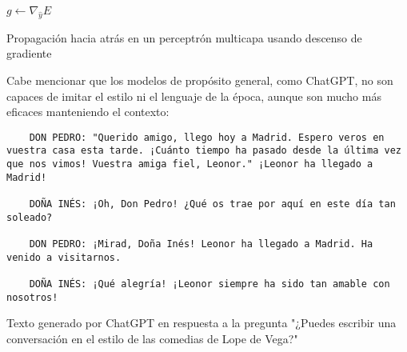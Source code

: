 \begin{algorithm}[tb]
    \SetAlgoLined
    $g \gets \nabla_{\widehat{y}} E$\;
    \caption{Propagación hacia atrás en un perceptrón multicapa usando descenso de gradiente}
    \label{algo:backward}
\end{algorithm}


Cabe mencionar que los modelos de propósito general, como ChatGPT, no son capaces de imitar el estilo ni el lenguaje de la época, aunque son mucho más eficaces manteniendo el contexto:

\begin{code}
    \centering
    \begin{verbatim}
    DON PEDRO: "Querido amigo, llego hoy a Madrid. Espero veros en vuestra casa esta tarde. ¡Cuánto tiempo ha pasado desde la última vez que nos vimos! Vuestra amiga fiel, Leonor." ¡Leonor ha llegado a Madrid!
    
    DOÑA INÉS: ¡Oh, Don Pedro! ¿Qué os trae por aquí en este día tan soleado?
    
    DON PEDRO: ¡Mirad, Doña Inés! Leonor ha llegado a Madrid. Ha venido a visitarnos.
    
    DOÑA INÉS: ¡Qué alegría! ¡Leonor siempre ha sido tan amable con nosotros!
    \end{verbatim}
    \caption{Texto generado por ChatGPT en respuesta a la pregunta "¿Puedes escribir una conversación en el estilo de las comedias de Lope de Vega?"}
    \label{fig:chatgpt}
\end{code}
